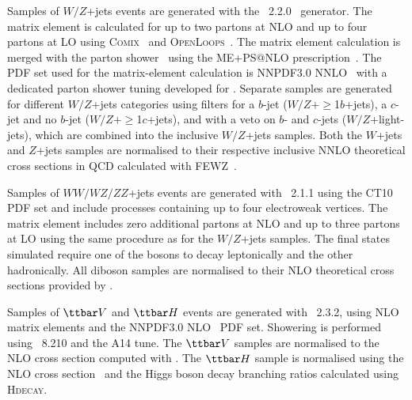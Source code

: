 Samples of $W/Z$+jets events are generated with the {\sherpa}~2.2.0~\cite{Gleisberg:2008ta} generator. 
The matrix element is calculated for up to two partons at NLO and up to four partons at LO using 
\textsc{Comix}~\cite{Gleisberg:2008fv} and \textsc{OpenLoops}~\cite{Cascioli:2011va}. The matrix element calculation 
is merged with the {\sherpa} parton shower~\cite{Schumann:2007mg} using the ME+PS@NLO prescription~\cite{Hoeche:2012yf}. 
The PDF set used for the matrix-element calculation is NNPDF3.0 NNLO~\cite{Ball:2014uwa} with a dedicated parton shower tuning developed for {\sherpa}. 
Separate samples are generated for different $W/Z$+jets categories using filters for a $b$-jet 
($W/Z+\geq$1$b$+jets), a $c$-jet and no $b$-jet ($W/Z+\geq$1$c$+jets), and with a veto on $b$- and $c$-jets 
($W/Z$+light-jets), which are combined into the inclusive $W/Z$+jets samples.
Both the $W$+jets and $Z$+jets samples are normalised to their respective inclusive NNLO theoretical 
cross sections in QCD calculated with \textsc{FEWZ}~\cite{Anastasiou:2003ds}.

Samples of $WW/WZ/ZZ$+jets events are generated with {\sherpa}~2.1.1 using the CT10 PDF set
and include processes containing up to four electroweak vertices. The matrix element includes zero additional partons 
at NLO and up to three partons at LO using the same procedure as for the $W/Z$+jets samples. 
The final states simulated require one of the bosons to decay leptonically and the other hadronically.
All diboson samples are normalised to their NLO theoretical cross sections provided by {\sherpa}. 

Samples of $\ttbar V$ and $\ttbar H$ events are generated with {\amcatnlo}~2.3.2, using 
NLO matrix elements and the NNPDF3.0 NLO~\cite{Ball:2014uwa} PDF set. 
Showering is performed using {\pythia}~8.210 and the A14 tune.
The $\ttbar V$ samples are normalised to the NLO cross section computed with {\amcatnlo}.
The $\ttbar H$ sample is normalised using the NLO cross section~\cite{Raitio:1978pt,Beenakker:2002nc,Dawson:2003zu,Yu:2014cka,Frixione:2015zaa}  
and the Higgs boson decay branching ratios calculated using \textsc{Hdecay}.



